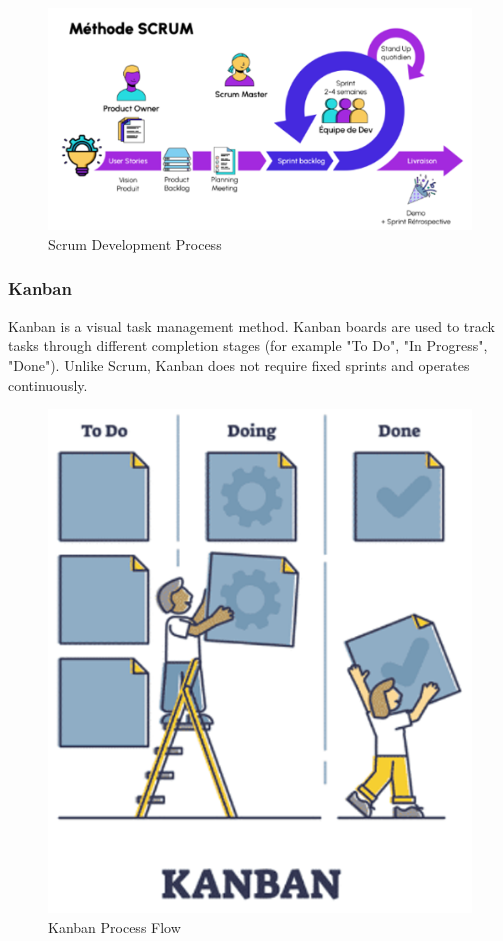 \begin{figure}[H]
    \centering
    \includegraphics[width=0.9\columnwidth]{img/architecture/Scrum.png}
    \caption{Scrum Development Process}
    \label{fig:scrum_process}
\end{figure}

\subsubsection{Kanban}

Kanban is a visual task management method. Kanban boards are used to track tasks through different completion stages (for example "To Do", "In Progress", "Done"). Unlike Scrum, Kanban does not require fixed sprints and operates continuously.

\begin{figure}[H]
    \centering
    \includegraphics[width=0.6\columnwidth]{img/architecture/kanban.png}
    \caption{Kanban Process Flow}
    \label{fig:kanban_process}
\end{figure}


